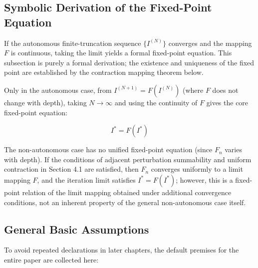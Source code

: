 \documentclass[11pt,a4paper]{amsart}
\begin{document}
\subsection{Symbolic Derivation of the Fixed-Point Equation}

If the autonomous finite-truncation sequence $\{I^{(N)}\}$ converges and the mapping $F$ is continuous, taking the limit yields a formal fixed-point equation. This subsection is purely a formal derivation; the existence and uniqueness of the fixed point are established by the contraction mapping theorem below.

Only in the autonomous case, from $I^{(N+1)} = F(I^{(N)})$ (where $F$ does not change with depth), taking $N \to \infty$ and using the continuity of $F$ gives the core fixed-point equation:

\begin{equation}
\label{eq:fixedpoint}
\boxed{I^* = F(I^*)}
\end{equation}

The non-autonomous case has no unified fixed-point equation (since $F_n$ varies with depth). If the conditions of adjacent perturbation summability and uniform contraction in Section 4.1 are satisfied, then $F_n$ converges uniformly to a limit mapping $F$, and the iteration limit satisfies $I^* = F(I^*)$; however, this is a fixed-point relation of the limit mapping obtained under additional convergence conditions, not an inherent property of the general non-autonomous case itself.

\subsection{General Basic Assumptions}

To avoid repeated declarations in later chapters, the default premises for the entire paper are collected here:
\end{document}
